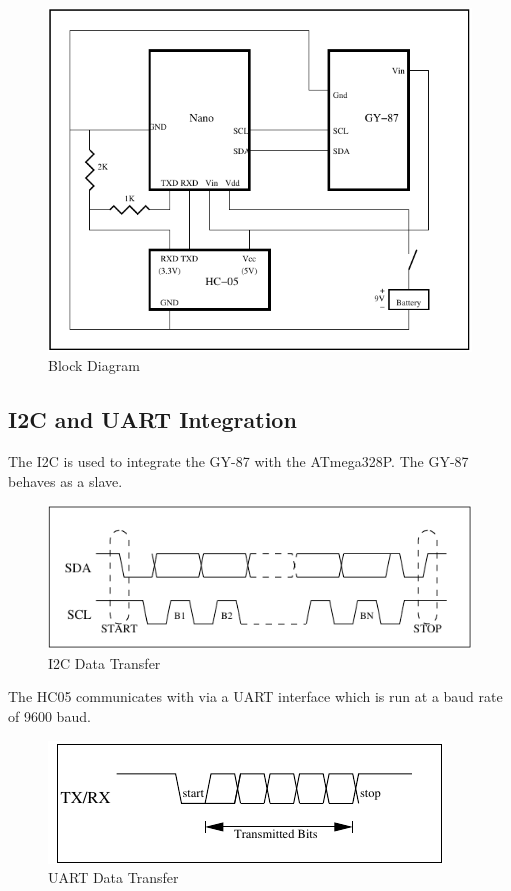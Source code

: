 \documentclass[11pt, a4paper]{article}
\begin{document}
\begin{figure}[htb]
    \centering
    \includegraphics[width=\linewidth]{BD.pdf}
    \caption{Block Diagram}
    \label{fig:blk_diagram}
\end{figure}


\subsection{I2C and UART Integration}
The I2C is used to integrate the GY-87 with the ATmega328P. The GY-87 behaves
as a slave. 

\begin{figure}[htb]
    \centering
    \includegraphics[width=\linewidth]{I2C_Timing.pdf}
    \caption{I2C Data Transfer}
    \label{fig:i2c_timing}
\end{figure}

\noindent The HC05 communicates with via a UART interface which is run at a
baud rate of 9600 baud.

\begin{figure}[htb]
    \centering
    \includegraphics[width=\linewidth]{UART_Timing.pdf}
    \caption{UART Data Transfer}
    \label{fig:uart_timing}
\end{figure}
\end{document}
